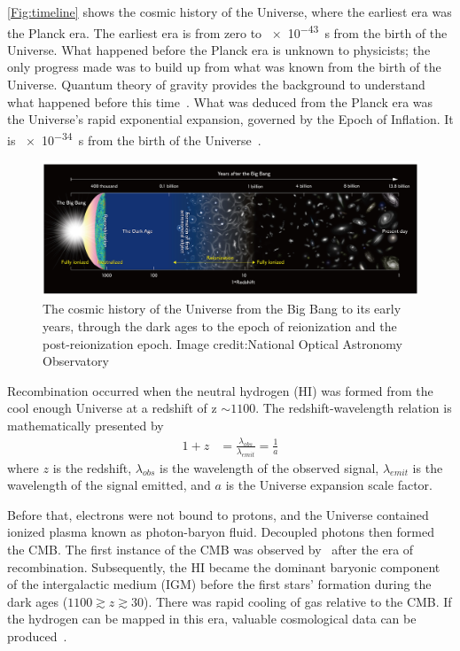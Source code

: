 	\autoref{Fig:timeline} shows the cosmic history of the Universe, where the earliest era was the Planck era. The earliest era is from zero to \SI{e-43}{s} from the birth of the Universe. What happened before the Planck era is unknown to physicists; the only progress made was to build up from what was known from the birth of the Universe. Quantum theory of gravity provides the background to understand what happened before this time~\citep{1981PhRvD..23..347G}. What was deduced from the Planck era was the Universe's rapid exponential expansion, governed by the Epoch of Inflation. It is \SI{e-34}{s} from the birth of the Universe~\citep{Planck}.
	
	\begin{figure}
		\begin{center}
			\includegraphics[width=\linewidth]{Figures/Reionizationtimeline.jpg}
			\caption{The cosmic history of the Universe from the Big Bang to its early years, through the dark ages to the epoch of reionization and the post-reionization epoch. Image credit:National Optical Astronomy Observatory}
			\label{Fig:timeline}
		\end{center}
	\end{figure}
	
	Recombination occurred when the neutral hydrogen (HI) was formed from the cool enough Universe at a redshift of z $\sim1100$. The redshift-wavelength relation is mathematically presented by
	\begin{equation}
	\begin{split}
	1+z & = \frac{\lambda_{obs}}{\lambda_{emit}}= \frac{1}{a}
	\end{split}
	\end{equation}
	where $z$ is the redshift, $\lambda_{obs}$ is the wavelength of the observed signal, $\lambda_{emit}$ is the wavelength of the signal emitted, and $a$ is the Universe expansion scale factor.
	
	Before that, electrons were not bound to protons, and the Universe contained ionized plasma known as photon-baryon fluid. Decoupled photons then formed the CMB. The first instance of the CMB was observed by~\citep{1965ApJ...142..419P} after the era of recombination. 
	Subsequently, the HI became the dominant baryonic component of the intergalactic medium (IGM) before the first stars' formation during the dark ages ($1100 \gtrsim z \gtrsim 30$). There was rapid cooling of gas relative to the CMB. If the hydrogen can be mapped in this era, valuable cosmological data can be produced~\citep{11, 2004PhRvL..92u1301L}.\\
	
